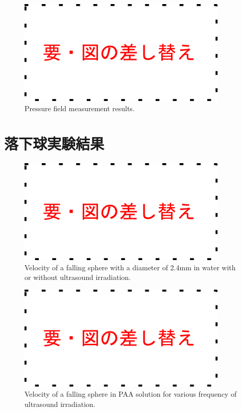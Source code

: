 \begin{figure}
    \centering
    \includegraphics[width=10cm,clip]{tmp.png}
    \caption{Pressure field measurement results.}
    \label{fig:pressure}
\end{figure}

\section{落下球実験結果}

\begin{figure}[h]
    \centering
    \includegraphics[width=10cm,clip]{tmp.png}
    \caption{Velocity of a falling sphere with a diameter of 2.4mm in water with or without ultrasound irradiation.}
    \label{fig:water}
\end{figure}

\begin{figure}[h]
    \centering
    \includegraphics[width=10cm,clip]{tmp.png}
    \caption{Velocity of a falling sphere in PAA solution for various frequency of
        ultrasound irradiation.}
    \label{fig:PAA-falling}
\end{figure}
